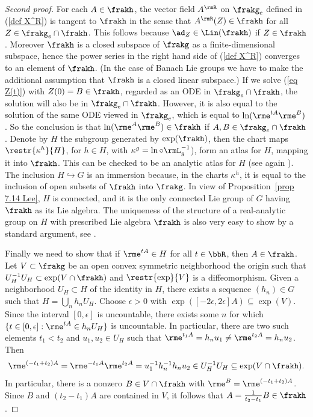 \begin{proof}[Second proof]
    For each $A\in\frakh$, the vector field $A^\rmR$ on $\frakg_e$ defined in (\ref{def X^R}) is tangent to $\frakh$ in the sense that $A^\rmR(Z)\in\frakh$ for all $Z\in\frakg_e\cap\frakh$. This follows because $\ad_Z\in\Lin(\frakh)$ if $Z\in\frakh$. Moreover $\frakh$ is a closed subspace of $\frakg$ as a finite-dimensional subspace, hence the power series in the right hand side of (\ref{def X^R}) converges to an element of $\frakh$. (In the case of Banach Lie groups we have to make the additional assumption that $\frakh$ is a closed linear subspace.) If we solve (\ref{eq Z(t)}) with $Z(0)=B\in\frakh$, regarded as an ODE in $\frakg_e\cap\frakh$, the solution will also be in $\frakg_e\cap\frakh$. However, it is also equal to the solution of the same ODE viewed in $\frakg_e$, which is equal to $\ln(\rme^{tA}\rme^B)$. So the conclusion is that $\ln(\rme^A\rme^B)\in\frakh$ if $A,B\in\frakg_e\cap\frakh$. Denote by $H$ the subgroup generated by $\exp(\frakh)$, then the chart maps $\restr{\kappa^h}{H}$, for $h\in H$, with $\kappa^g=\ln\circ \rmL_g^{-1}$), form an atlas for $H$, mapping it into $\frakh$. This can be checked to be an analytic atlas for $H$ (see again \cite[Thm.~1.6.3]{DK}). The inclusion $H\hookrightarrow G$ is an immersion because, in the charts $\kappa^h$, it is equal to the inclusion of open subsets of $\frakh$ into $\frakg$. In view of Proposition~\ref{prop 7.14 Lee}, $H$ is connected, and it is the only connected Lie group of $G$ having $\frakh$ as its Lie algebra. The uniqueness of the structure of a real-analytic group on $H$ with prescribed Lie algebra $\frakh$ is also very easy to show by a standard argument, see \cite[Prop.~1.6.4]{DK}.

    Finally we need to show that if $\rme^{tA}\in H$ for all $t\in\bbR$, then $A\in\frakh$. Let $V\subset\frakg$ be an open convex symmetric neighborhood the origin such that $U_H^{-1}U_H\subset \exp(V\cap \frakh)$ and $\restr{\exp}{V}$ is a diffeomorphism. Given a neighborhood $U_H\subset H$ of the identity in $H$, there exists a sequence $(h_n)\in G$ such that $H=\bigcup_n h_nU_H$. Choose $\epsilon>0$ with $\exp([-2\epsilon,2\epsilon]A)\subseteq \exp(V)$. Since the interval $[0,\epsilon]$ is uncountable, there exists some $n$ for which $\{t\in [0,\epsilon]:\rme^{tA}\in h_nU_H\}$ is uncountable. In particular, there are two such elements $t_1<t_2$ and $u_1,u_2\in U_H$ such that $\rme^{t_1A}=h_nu_1\neq \rme^{t_2A}=h_nu_2$. Then
    \[\rme^{(-t_1+t_2)A}=\rme^{-t_1A}\rme^{t_2A}=u_1^{-1}h_n^{-1}h_nu_2\in U_H^{-1}U_H\subseteq \exp(V\cap\frakh).\]
    In particular, there is a nonzero $B\in V\cap\frakh$ with $\rme^B=\rme^{(-t_1+t_2)A}$. Since $B$ and $(t_2-t_1)A$ are contained in $V$, it follows that $A=\frac{1}{t_2-t_1}B\in\frakh$.
 \end{proof}


